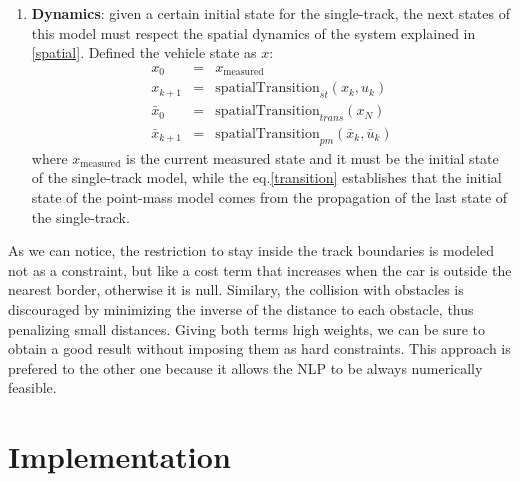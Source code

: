 \documentclass[a4paper, onecolumn, 12pt]{article}
\begin{document}
\begin{enumerate}
    \item \textbf{Dynamics}: given a certain initial state for the single-track, the next states of this model must respect the
    spatial dynamics of the system explained in \ref{spatial}. Defined the vehicle state as $x$:
    \begin{eqnarray}
        x_0 &=& x_{\text{measured}} \\
        x_{k+1} &=& \text{spatialTransition}_{st}(x_k, u_k) \\
        \bar{x}_0 &=& \text{spatialTransition}_{trans}(x_N) \label{transition}\\
        \bar{x}_{k+1} &=& \text{spatialTransition}_{pm}(\bar{x}_k, \bar{u}_k)
    \end{eqnarray}
    where $x_{\text{measured}}$ is the current measured state and it must be the initial state of the single-track model,
    while the eq.\ref{transition} establishes that the initial state of the point-mass model comes from the propagation of 
    the last state of the single-track.
\end{enumerate}
As we can notice, the restriction to stay inside the track boundaries is modeled
not as a constraint, but like a cost term that increases when the car is outside
the nearest border, otherwise it is null. Similary, the collision with obstacles
is discouraged by minimizing the inverse of the distance to each obstacle, thus
penalizing small distances. Giving both terms high weights, we can be sure to
obtain a good result without imposing them as hard constraints. This approach is
prefered to the other one because it allows the NLP to be always numerically
feasible.

\newpage

\section{Implementation}
\end{document}
